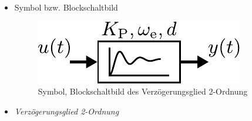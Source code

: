 \begin{itemize}
\begin{itemize}
	\end{itemize}
	\item Symbol bzw. Blockschaltbild
	\begin{figure}[h]
		\centering
		\includegraphics[width=0.3\linewidth]{Abbildungen/Modellbildung/PDF/PT2gliedBlock.pdf}
		\caption{Symbol, Blockschaltbild des Verzögerungsglied 2-Ordnung}
		\label{fig:pt2glied}
	\end{figure}
\end{itemize}
%
\begin{simulation}{}{}
	\begin{itemize}
		\item \textit{Verzögerungsglied 2-Ordnung}
	\end{itemize}
\end{simulation}
%
